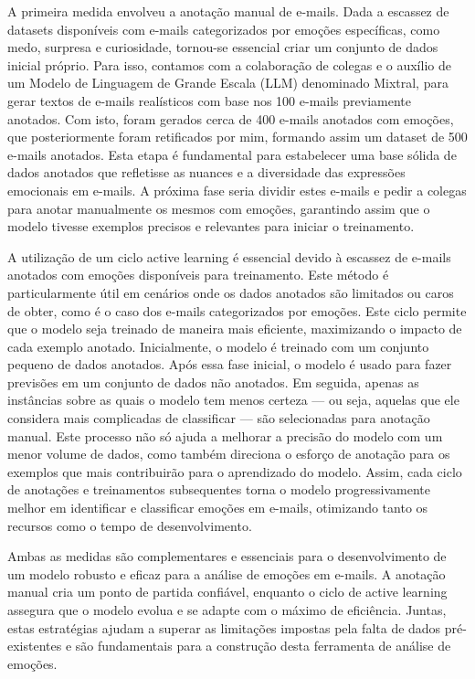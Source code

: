 A primeira medida envolveu a anotação manual de e-mails. Dada a escassez de datasets disponíveis com e-mails categorizados por emoções específicas, como medo, surpresa e curiosidade, tornou-se essencial criar um conjunto de dados inicial próprio. Para isso, contamos com a colaboração de colegas e o auxílio de um Modelo de Linguagem de Grande Escala (LLM) denominado Mixtral, para gerar textos de e-mails realísticos com base nos 100 e-mails previamente anotados. Com isto, foram gerados cerca de 400 e-mails anotados com emoções, que posteriormente foram retificados por mim, formando assim um dataset de 500 e-mails anotados. Esta etapa é fundamental para estabelecer uma base sólida de dados anotados que refletisse as nuances e a diversidade das expressões emocionais em e-mails. A próxima fase seria dividir estes e-mails e pedir a colegas para anotar manualmente os mesmos com emoções, garantindo assim que o modelo tivesse exemplos precisos e relevantes para iniciar o treinamento.

A utilização de um ciclo active learning é essencial devido à escassez de e-mails anotados com emoções disponíveis para treinamento. Este método é particularmente útil em cenários onde os dados anotados são limitados ou caros de obter, como é o caso dos e-mails categorizados por emoções.
Este ciclo permite que o modelo seja treinado de maneira mais eficiente, maximizando o impacto de cada exemplo anotado. Inicialmente, o modelo é treinado com um conjunto pequeno de dados anotados. Após essa fase inicial, o modelo é usado para fazer previsões em um conjunto de dados não anotados. Em seguida, apenas as instâncias sobre as quais o modelo tem menos certeza — ou seja, aquelas que ele considera mais complicadas de classificar — são selecionadas para anotação manual.
Este processo não só ajuda a melhorar a precisão do modelo com um menor volume de dados, como também direciona o esforço de anotação para os exemplos que mais contribuirão para o aprendizado do modelo. Assim, cada ciclo de anotações e treinamentos subsequentes torna o modelo progressivamente melhor em identificar e classificar emoções em e-mails, otimizando tanto os recursos como o tempo de desenvolvimento.

Ambas as medidas são complementares e essenciais para o desenvolvimento de um modelo robusto e eficaz para a análise de emoções em e-mails. A anotação manual cria um ponto de partida confiável, enquanto o ciclo de active learning assegura que o modelo evolua e se adapte com o máximo de eficiência. Juntas, estas estratégias ajudam a superar as limitações impostas pela falta de dados pré-existentes e são fundamentais para a construção desta ferramenta de análise de emoções.



